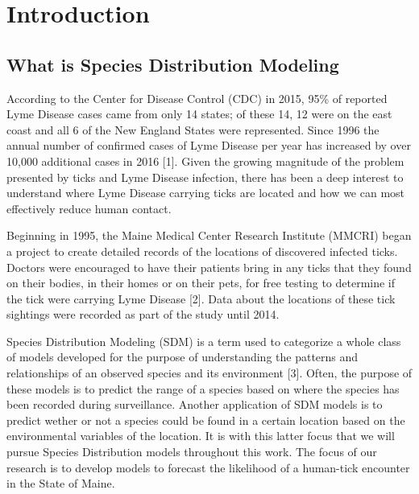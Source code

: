 
\chapter{Introduction} %

\label{Chapter1} %


\newcommand{\keyword}[1]{\textbf{#1}}
\newcommand{\tabhead}[1]{\textbf{#1}}
\newcommand{\code}[1]{\texttt{#1}}
\newcommand{\file}[1]{\texttt{\bfseries#1}}
\newcommand{\option}[1]{\texttt{\itshape#1}}


\section{What is Species Distribution Modeling}
According to the Center for Disease Control (CDC) in 2015, 95\% of reported Lyme Disease cases came from only 14 states; of these 14, 12 were on the east coast and all 6 of the New England States were represented. Since 1996 the annual number of confirmed cases of Lyme Disease per year has increased by over 10,000 additional cases in 2016 [1]. Given the growing magnitude of the problem presented by ticks and Lyme Disease infection, there has been a deep interest to understand where Lyme Disease carrying ticks are located and how we can most effectively reduce human contact. \newline

\noindent Beginning in 1995, the Maine Medical Center Research Institute (MMCRI) began a project to create detailed records of the locations of discovered infected ticks. Doctors were encouraged to have their patients bring in any ticks that they found on their bodies, in their homes or on their pets, for free testing to determine if the tick were carrying Lyme Disease [2]. Data about the locations of these tick sightings were recorded as part of the study until 2014. \newline

\noindent Species Distribution Modeling (SDM) is a term used to categorize a whole class of models developed for the purpose of understanding the patterns and relationships of an observed species and its environment [3]. Often, the purpose of these models is to predict the range of a species based on where the species has been recorded during surveillance. Another application of SDM models is to predict wether or not a species could be found in a certain location based on the environmental variables of the location. It is with this latter focus that we will pursue Species Distribution models throughout this work. The focus of our research is to develop models to forecast the likelihood of a human-tick encounter in the State of Maine.  \newline

